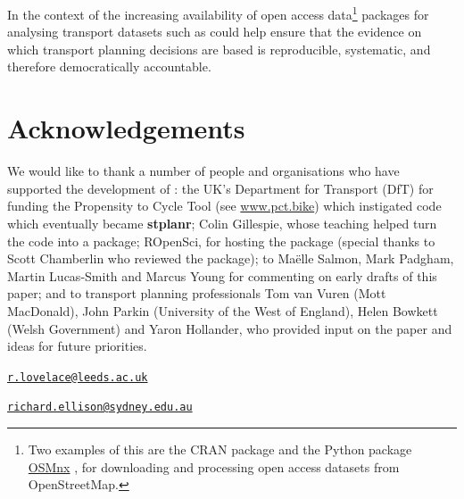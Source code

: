 %
In the context of the increasing availability of open access data\footnote{Two
examples of this are the  CRAN package \citep{Padgham2017} and the Python package
\href{https://github.com/gboeing/osmnx}{OSMnx} \citep{boeing_osmnx:_2017}, for downloading and processing
open access datasets from OpenStreetMap.}
packages for analysing transport datasets such as  could help
ensure that the
evidence on which transport planning decisions are based is reproducible,
systematic, and therefore democratically accountable.

\section{Acknowledgements}

We would like to thank a number of people and organisations who have supported the development of :
the UK's Department for Transport (DfT) for funding the Propensity to Cycle Tool (see \href{http://www.pct.bike/}{www.pct.bike})
which instigated code which eventually became \textbf{stplanr};
Colin Gillespie, whose teaching helped turn the code into a package;
ROpenSci, for hosting the package (special thanks to Scott Chamberlin who reviewed the package);
to Ma{\"e}lle Salmon, Mark Padgham, Martin Lucas-Smith and Marcus Young for commenting on early drafts of this paper;
and to transport planning professionals Tom van Vuren (Mott MacDonald), John Parkin (University of the West of England), Helen Bowkett (Welsh Government) and Yaron Hollander, who provided input on the paper and ideas for future priorities.



\address{%
Robin Lovelace\\
University of Leeds\\
34-40 University Road\\ LS2 9JT, UK\\
}
\href{mailto:r.lovelace@leeds.ac.uk}{\nolinkurl{r.lovelace@leeds.ac.uk}}

\address{%
Richard Ellison\\
University of Sydney\\
378 Abercrombie Street\\ Darlington, NSW 2008, Australia\\
}
\href{mailto:richard.ellison@sydney.edu.au}{\nolinkurl{richard.ellison@sydney.edu.au}}


